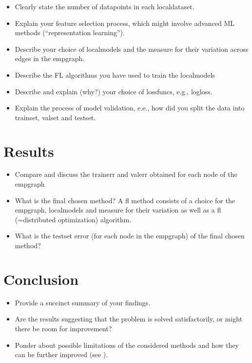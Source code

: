 \documentclass{article}
\begin{document}
\begin{itemize} 
\item Clearly state the number of \gls{datapoint}s in each \gls{localdataset}. 
\item Explain your \gls{feature} selection process, which might involve advanced 
ML methods (``representation learning''). 
\item Describe your choice of \gls{localmodel}s and the measure for their variation across edges 
in the \gls{empgraph}. 
\item Describe the FL algorithms you have used to train the \gls{localmodel}s \cite[Sec. 9]{lecnotesfl}
\item Describe and explain (why?) your choice of \gls{lossfunc}s, e.g., \gls{logloss}.
\item Explain the process of model \gls{validation}, e.e., how did you split the data into \gls{trainset}, \gls{valset} and \gls{testset}. 
\end{itemize} 

\section{Results} 
\label{sec_results} 

\begin{itemize} 
	\item Compare and discuss the \gls{trainerr} and \gls{valerr} obtained for each node of the \gls{empgraph}
	\item What is the final chosen method? A \gls{fl} method consists of a choice for the \gls{empgraph}, 
	\gls{localmodel}s and measure for their variation as well as a \gls{fl} (=distributed optimization) algorithm. 
	\item What is the \gls{testset} error (for each node in the \gls{empgraph}) of the final chosen method?
\end{itemize} 

\section{Conclusion}

\begin{itemize} 
\item Provide a succinct summary of your findings.
\item Are the results suggesting that the problem is solved satisfactorily, or might
there be room for improvement?
\item Ponder about possible limitations of the considered methods and how they  
can be further improved (see \cite[Sec. 6.6.]{MLBasics}).
\end{itemize} 



\newpage




\printglossaries
\end{document}
